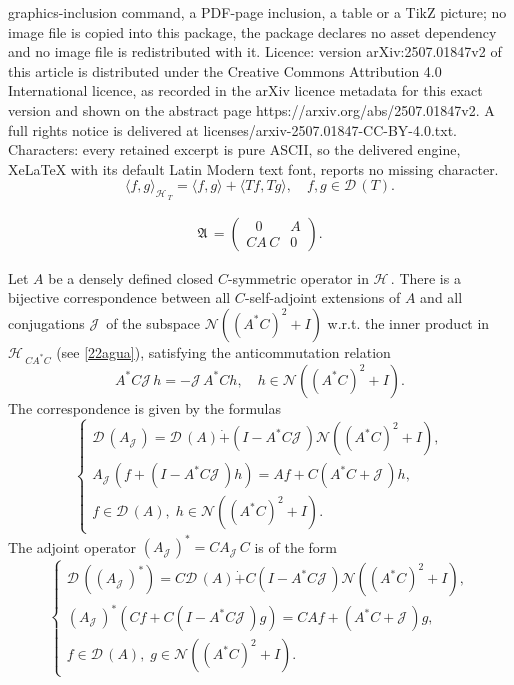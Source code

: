 \documentclass[10pt,a4paper]{amsart}
\newcommand{\cD}{\mathcal{D}\,}
\newcommand{\cH}{\mathcal{H}\,}
\newcommand{\cJ}{\mathcal{J}\,}
\newcommand{\cN}{\mathcal{N}}
\newcommand{\gA}{\mathfrak{A}\,}
\begin{document}
graphics-inclusion command, a PDF-page inclusion, a table or a TikZ picture; no image file is copied into this package, the package declares no asset dependency and no image file is redistributed with it. Licence: version arXiv:2507.01847v2 of this article is distributed under the Creative Commons Attribution 4.0 International licence, as recorded in the arXiv licence metadata for this exact version and shown on the abstract page https://arxiv.org/abs/2507.01847v2. A full rights notice is delivered at licenses/arxiv-2507.01847-CC-BY-4.0.txt. Characters: every retained excerpt is pure ASCII, so the delivered engine, XeLaTeX with its default Latin Modern text font, reports no missing character.
\begin{equation}\label{22agua}
\langle f,g\rangle_{\cH_T}=\langle f,g\rangle +\langle Tf,Tg\rangle, \quad f,g\in \cD(T).
\end{equation}

\begin{gather}\label{matrixtbt1}
\gA=\left(
\begin{array}{ll}
~~~ 0 & A \\
CA\,C & 0
\end{array}\right).
\end{gather}

\begin{thm}\label{gua30a}
Let $A$ be a densely defined closed $C$-symmetric operator in $\cH$. There is a bijective correspondence between all $C$-self-adjoint extensions of $A$ and all conjugations $\cJ$ of the subspace $\cN((A^*C)^2+I)$ w.r.t. the inner product in $\cH_{CA^*C}$ (see \eqref{22agua}), satisfying the anticommutation relation
\begin{equation}\label{30aagua}
A^*C\cJ h=-\cJ A^*Ch, \quad h\in \cN((A^*C)^2+I).
\end{equation}
 The correspondence is given by the formulas
 \begin{equation}\label{21abgua}
\left\{\begin{array}{l}  \cD(A_{\cJ})=\cD(A)\dot+(I-A^*C \cJ)\cN((A^*C)^2+I),\\[2mm]
A_{\cJ} (f+(I-A^*C \cJ)h)=Af+C(A^*C+\cJ)h,\\[2mm]
 f\in\cD(A),\; h\in\cN( (A^*C)^2+I).
\end{array}\right.
  \end{equation}
  The adjoint operator $(A_{\cJ})^*=CA_\cJ C$ is of the form
\begin{equation}\label{21bcgua}
\left\{ \begin{array}{l}
\cD((A_\cJ)^*)=C\cD(A)\dot+C(I-A^*C\cJ)\cN((A^*C)^2+I),\\[2mm] %
(A_\cJ)^*(Cf+C(I-A^*C\cJ)g)=CAf+(A^*C+\cJ)g,\\[2mm]
f\in\cD(A),\; g\in\cN( (A^*C)^2+I).
\end{array}\right.
\end{equation}

\end{thm}
\end{document}
